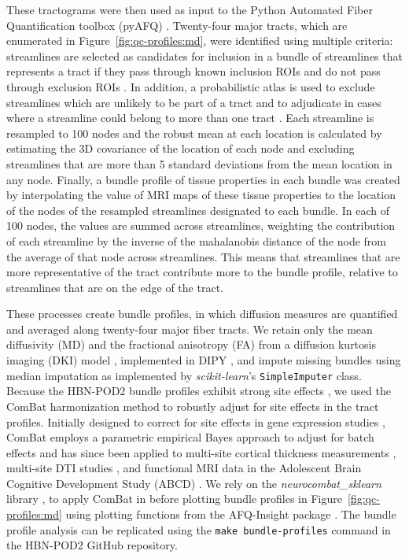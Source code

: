 \documentclass[fleqn,10pt,inline]{wlscirep}
\begin{document}
These tractograms were then used as input to the Python Automated Fiber
Quantification toolbox (pyAFQ) \cite{kruper2021evaluating}. Twenty-four major
tracts, which are enumerated in Figure~\ref{fig:qc-profiles:md}, were identified using
multiple criteria: streamlines are selected as candidates for inclusion in a
bundle of streamlines that represents a tract if they pass through known
inclusion ROIs and do not pass through exclusion ROIs \cite{Wakana2007-nw}. In
addition, a probabilistic atlas is used to exclude streamlines which are
unlikely to be part of a tract and to adjudicate in cases where a streamline
could belong to more than one tract \cite{Hua2008-di}. Each streamline is
resampled to 100 nodes and the robust mean at each location is calculated by
estimating the 3D covariance of the location of each node and excluding
streamlines that are more than 5 standard deviations from the mean location in
any node. Finally, a bundle profile of tissue properties in each bundle was
created by interpolating the value of MRI maps of these tissue properties to the
location of the nodes of the resampled streamlines designated to each bundle. In
each of 100 nodes, the values are summed across streamlines, weighting the
contribution of each streamline by the inverse of the mahalanobis distance of
the node from the average of that node across streamlines. This means that
streamlines that are more representative of the tract contribute more to the
bundle profile, relative to streamlines that are on the edge of the tract.

These processes create bundle profiles, in which diffusion measures are
quantified and averaged along twenty-four major fiber tracts. We retain only the
mean diffusivity (MD) and the fractional anisotropy (FA) from a diffusion
kurtosis imaging (DKI) model \cite{jensen2005-ta}, implemented in DIPY \cite{Henriques2021-lk}, and impute missing bundles
using median imputation as implemented by \emph{scikit-learn}'s
\texttt{SimpleImputer} class. 
Because the HBN-POD2 bundle
profiles exhibit strong site effects \cite{richie-halford2021multidimensional},
we used the ComBat harmonization method to robustly adjust for site effects in
the tract profiles. Initially designed to correct for site effects in gene
expression studies \cite{Johnson2007-kl}, ComBat employs a parametric empirical
Bayes approach to adjust for batch effects and has since been applied to
multi-site cortical thickness measurements \cite{fortin2018-hk}, multi-site DTI
studies \cite{fortin2017-be}, and functional MRI data in the Adolescent Brain
Cognitive Development Study (ABCD) \cite{nielson2018detecting}. We rely on the
\emph{neurocombat\_sklearn} library \cite{neurocombat-sklearn}, to apply ComBat in
before plotting bundle profiles in Figure~\ref{fig:qc-profiles:md} using
plotting functions from the AFQ-Insight package
\cite{richie-halford2019insight}. The bundle profile analysis can be replicated
using the \texttt{make bundle-profiles} command in the HBN-POD2 GitHub
repository.
\end{document}
